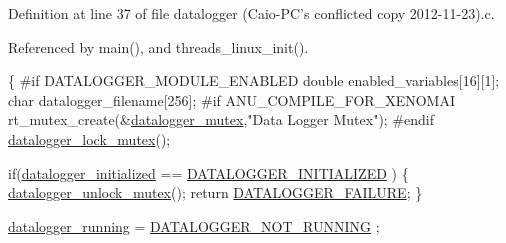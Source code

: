 Definition at line 37 of file datalogger (\-Caio-\/\-P\-C's conflicted copy 2012-\/11-\/23).\-c.



Referenced by main(), and threads\-\_\-linux\-\_\-init().


\begin{DoxyCode}
\{
\textcolor{preprocessor}{    #if DATALOGGER\_MODULE\_ENABLED}
\textcolor{preprocessor}{}    \textcolor{keywordtype}{double} enabled\_variables[16][1];
    \textcolor{keywordtype}{char} datalogger\_filename[256];
\textcolor{preprocessor}{        #if ANU\_COMPILE\_FOR\_XENOMAI}
\textcolor{preprocessor}{}    rt\_mutex\_create(&\hyperlink{datalogger_01_07Caio-PC's_01conflicted_01copy_012012-11-23_08_8c_a824d6f7fd1d3898ba0b1100ba37875c6}{datalogger\_mutex},\textcolor{stringliteral}{"Data Logger Mutex"});
\textcolor{preprocessor}{        #endif}
\textcolor{preprocessor}{}    \hyperlink{datalogger_01_07Caio-PC's_01conflicted_01copy_012012-11-23_08_8c_a54b06d9395b2e370a5a72beb7f9524b2}{datalogger\_lock\_mutex}();

    \textcolor{keywordflow}{if}(\hyperlink{datalogger_01_07Caio-PC's_01conflicted_01copy_012012-11-23_08_8c_a35e8fbe04b90452afdc3c1be16ff6187}{datalogger\_initialized} == \hyperlink{datalogger_01_07Caio-PC's_01conflicted_01copy_012012-11-23_08_8h_a684c343d340004b77ca2b782934c96ca}{DATALOGGER\_INITIALIZED}
      )
    \{
        \hyperlink{datalogger_01_07Caio-PC's_01conflicted_01copy_012012-11-23_08_8c_a85453211c0c809083c36cc56b275aeeb}{datalogger\_unlock\_mutex}();
        \textcolor{keywordflow}{return} \hyperlink{datalogger_01_07Caio-PC's_01conflicted_01copy_012012-11-23_08_8h_ac52138ca42979f6e1f1d589020ff9f83}{DATALOGGER\_FAILURE};
    \}

    \hyperlink{datalogger_01_07Caio-PC's_01conflicted_01copy_012012-11-23_08_8c_a185c3ede96449d14f330fe5ac664e799}{datalogger\_running} = \hyperlink{datalogger_01_07Caio-PC's_01conflicted_01copy_012012-11-23_08_8h_a1a224da36800f52f56f30619849f7f5d}{DATALOGGER\_NOT\_RUNNING}
      ;


\end{DoxyCode}
